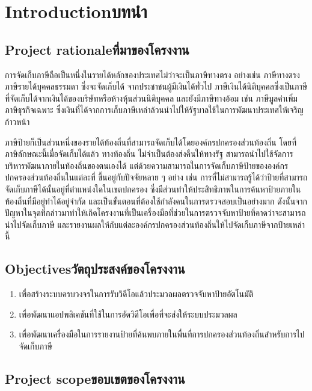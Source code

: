 \chapter{\ifenglish Introduction\else บทนำ\fi}

\section{\ifenglish Project rationale\else ที่มาของโครงงาน\fi}

การจัดเก็บภาษีถือเป็นหนึ่งในรายได้หลักของประเทศไม่ว่าจะเป็นภาษีทางตรง อย่างเช่น ภาษีทางตรง ภาษีรายได้บุคคลธรรมดา ซึ่งจะจัดเก็บได้
จากประชาชนผู้มีเงินได้ทั่วไป ภาษีเงินได้นิติบุคคลซึ่งเป็นภาษีที่จัดเก็บได้จากเงินได้ของบริษัทหรือห้างหุ้นส่วนนิติบุคคล และยังมีภาษีทางอ้อม เช่น 
ภาษีมูลค่าเพิ่ม ภาษีธุรกิจเฉพาะ ซึ่งเงินที่ได้จากการเก็บภาษีเหล่าล้วนนำไปให้รัฐบาลใช้ในการพัฒนาประเทศให้เจริญก้าวหน้า  

ภาษีป้ายก็เป็นส่วนหนึ่งของรายได้ท้องถิ่นที่สามารถจัดเก็บได้โดยองค์กรปกครองส่วนท้องถิ่น โดยที่ภาษีลักษณะนี้เมื่อจัดเก็บได้แล้ว ทางท้องถิ่น
ไม่จำเป็นต้องส่งคืนให้ทางรัฐ สามารถนำไปใช้จัดการบริหารพัฒนาภายในท้องถิ่นของตนเองได้ 
แต่ด้วยความสามารถในการจัดเก็บภาษีป้ายขององค์กรปกครองส่วนท้องถิ่นในแต่ละที่ ขึ้นอยู่กับปัจจัยหลาย ๆ อย่าง เช่น 
การที่ไม่สามารถรู้ได้ว่าป้ายที่สามารถจัดเก็บภาษีได้นั้นอยู่ที่ตำแหน่งใดในเขตปกครอง ซึ่งมีส่วนทำให้ประสิทธิภาพในการค้นหาป้ายภายในท้องถิ่นที่มีอยู่ทำได้อยู่จำกัด
และเป็นขั้นตอนที่ต้องใช้กำลังคนในการตรวจสอบเป็นอย่างมาก 
ดังนั้นจากปัญหาในจุดที่กล่าวมาทำให้เกิดโครงงานที่เป็นเครื่องมือที่ช่วยในการตรวจจับหาป้ายที่คาดว่าจะสามารถนำไปจัดเก็บภาษี 
และรายงานผลให้กับแต่ละองค์กรปกครองส่วนท้องถิ่นให้ไปจัดเก็บภาษีจากป้ายเหล่านี้

\section{\ifenglish Objectives\else วัตถุประสงค์ของโครงงาน\fi}
\begin{enumerate}
    \item เพื่อสร้างระบบครบวงจรในการรับวิดีโอแล้วประมวลผลตรวจจับหาป้ายอัตโนมัติ
    \item เพื่อพัฒนาแอปพลิเคชันที่ใช้ในการอัดวิดีโอเพื่อที่จะส่งให้ระบบประมวลผล 
    \item เพื่อพัฒนาเครื่องมือในการรายงานป้ายที่ค้นพบภายในพื่นที่การปกครองส่วนท้องถิ่นสำหรับการไปจัดเก็บภาษี 
\end{enumerate}

\section{\ifenglish Project scope\else ขอบเขตของโครงงาน\fi}

